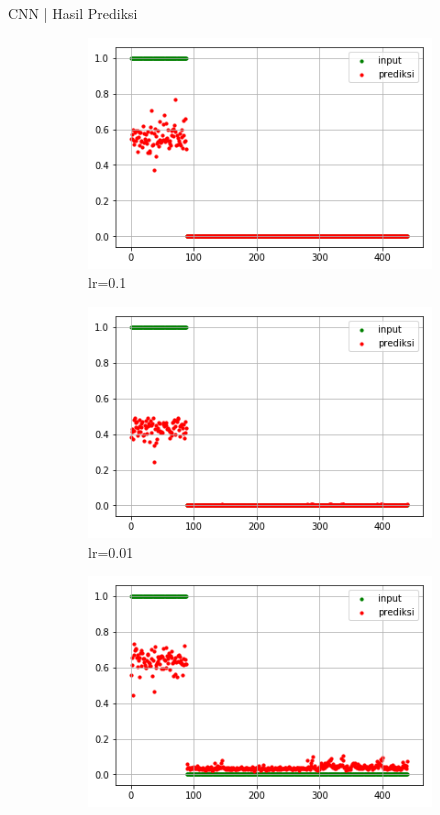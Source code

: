 \documentclass[t]{beamer}
\begin{document}
\begin{frame}{CNN | Hasil Prediksi}
\begin{figure}[H]
    \begin{subfigure}[b]{.23\linewidth}
        \includegraphics[width=\textwidth]{public/assets/img/cnn_svchosta_train_pred01.png}
        \caption{lr=0.1} 
    \end{subfigure}
    \begin{subfigure}[b]{.23\linewidth}
        \includegraphics[width=\textwidth]{public/assets/img/cnn_svchosta_train_pred001.png}
        \caption{lr=0.01}
    \end{subfigure}
    \begin{subfigure}[b]{.23\linewidth}
        \includegraphics[width=\textwidth]{public/assets/img/cnn_svchosta_train_pred0001.png}

\end{subfigure}
\end{figure}
\end{frame}
\end{document}
